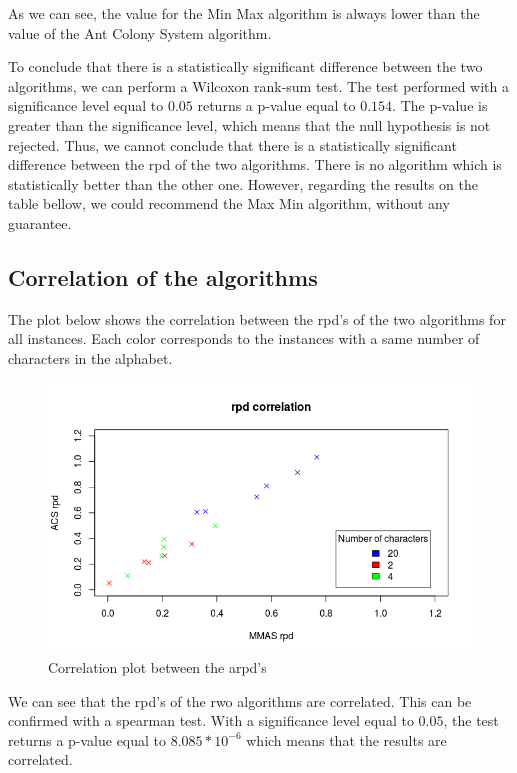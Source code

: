 \documentclass{article}
\begin{document}
As we can see, the value for the Min Max algorithm is always lower than the value of the Ant Colony System algorithm. \newline

To conclude that there is a statistically significant difference between the two algorithms, we can perform a Wilcoxon rank-sum test.
The test performed with a significance level equal to $0.05$ returns a p-value equal to $0.154$.
The p-value is greater than the significance level, which means that the null hypothesis is not rejected.
Thus, we cannot conclude that there is a statistically significant difference between the rpd of the two algorithms.
There is no algorithm which is statistically better than the other one.
However, regarding the results on the table bellow, we could recommend the Max Min algorithm, without any guarantee.

\subsection{Correlation of the algorithms}

The plot below shows the correlation between the rpd's of the two algorithms for all instances.
Each color corresponds to the instances with a same number of characters in the alphabet.

\begin{figure}
    \centering
        \includegraphics[scale=0.5]{correl}
    \caption{Correlation plot between the arpd's}
    \label{fig:corr}
\end{figure}

We can see that the rpd's of the rwo algorithms are correlated.
This can be confirmed with a spearman test.
With a significance level equal to $0.05$, the test returns a p-value equal to $8.085*10^{-6}$ which means that the results are correlated.
\end{document}
